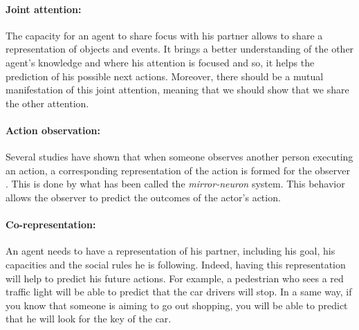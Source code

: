 \documentclass[english,a4paper,11pt,twoside]{StyleThese}
\begin{document}
\paragraph{Joint attention:} The capacity for an agent to share focus with his partner allows to share a representation of objects and events. It brings a better understanding of the other agent's knowledge and where his attention is focused and so, it helps the prediction of his possible next actions. Moreover, there should be a mutual manifestation of this joint attention, meaning that we should show that we share the other attention. 

\paragraph{Action observation:} Several studies have shown that when someone observes another person executing an action, a corresponding representation of the action is formed for the observer \cite{rizzolatti2004mirror}. This is done by what has been called the \textit{mirror-neuron} system. This behavior allows the observer to predict the outcomes of the actor's action. 

\paragraph{Co-representation:} An agent needs to have a representation of his partner, including his goal, his capacities and the social rules he is following. Indeed, having this representation will help to predict his future actions. For example, a pedestrian who sees a red traffic light will be able to predict that the car drivers will stop. In a same way, if you know that someone is aiming to go out shopping, you will be able to predict that he will look for the key of the car.

\end{document}
